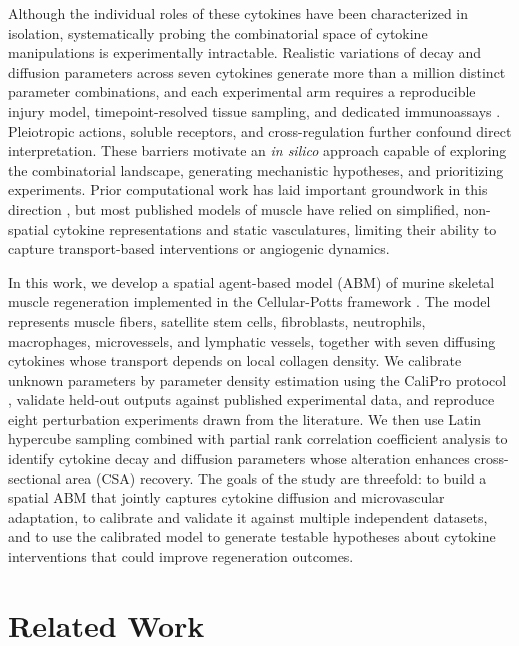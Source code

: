 \documentclass[10pt,letterpaper]{article}
\begin{document}
Although the individual roles of these cytokines have been characterized in isolation, systematically probing the combinatorial space of cytokine manipulations is experimentally intractable. Realistic variations of decay and diffusion parameters across seven cytokines generate more than a million distinct parameter combinations, and each experimental arm requires a reproducible injury model, timepoint-resolved tissue sampling, and dedicated immunoassays \cite{wehling2009interleukin}. Pleiotropic actions, soluble receptors, and cross-regulation further confound direct interpretation. These barriers motivate an \emph{in silico} approach capable of exploring the combinatorial landscape, generating mechanistic hypotheses, and prioritizing experiments. Prior computational work has laid important groundwork in this direction \cite{virgilio2015multiscale,martin2017agent}, but most published models of muscle have relied on simplified, non-spatial cytokine representations and static vasculatures, limiting their ability to capture transport-based interventions or angiogenic dynamics.

In this work, we develop a spatial agent-based model (ABM) of murine skeletal muscle regeneration implemented in the Cellular-Potts framework \cite{graner1992simulation,swat2012compucell3d}. The model represents muscle fibers, satellite stem cells, fibroblasts, neutrophils, macrophages, microvessels, and lymphatic vessels, together with seven diffusing cytokines whose transport depends on local collagen density. We calibrate unknown parameters by parameter density estimation using the CaliPro protocol \cite{joslyn2021calipro}, validate held-out outputs against published experimental data, and reproduce eight perturbation experiments drawn from the literature. We then use Latin hypercube sampling combined with partial rank correlation coefficient analysis \cite{marino2008sensitivity} to identify cytokine decay and diffusion parameters whose alteration enhances cross-sectional area (CSA) recovery. The goals of the study are threefold: to build a spatial ABM that jointly captures cytokine diffusion and microvascular adaptation, to calibrate and validate it against multiple independent datasets, and to use the calibrated model to generate testable hypotheses about cytokine interventions that could improve regeneration outcomes.

\section{Related Work}
\label{sec:related}
\end{document}
